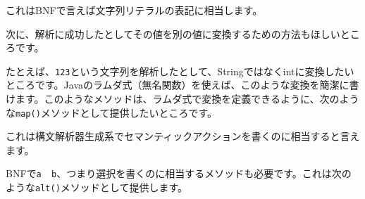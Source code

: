 これはBNFで言えば文字列リテラルの表記に相当します。

次に、解析に成功したとしてその値を別の値に変換するための方法もほしいところです。

たとえば、\texttt{123}という文字列を解析したとして、Stringではなくintに変換したいところです。Javaのラムダ式（無名関数）を使えば、このような変換を簡潔に書けます。このようなメソッドは、ラムダ式で変換を定義できるように、次のような\texttt{map()}メソッドとして提供したいところです。

\begin{Shaded}
\begin{Highlighting}[]
\NormalTok{ (} \NormalTok{\textless{}}\NormalTok{\textgreater{}(}\NormalTok{, }\NormalTok{(}
    \NormalTok{(}\NormalTok{(}\NormalTok{(}\NormalTok{)}
\NormalTok{);}
\end{Highlighting}
\end{Shaded}

これは構文解析器生成系でセマンティックアクションを書くのに相当すると言えます。

BNFで\texttt{a\ \textbar{}\ b}、つまり選択を書くのに相当するメソッドも必要です。これは次のような\texttt{alt()}メソッドとして提供します。

\begin{Shaded}
\begin{Highlighting}[]
\NormalTok{ (} \NormalTok{\textless{}}\NormalTok{\textgreater{}(}\NormalTok{, }\NormalTok{(}
    \NormalTok{(}\NormalTok{(}\NormalTok{), }\NormalTok{(}\NormalTok{(}\NormalTok{)}
\NormalTok{);}
\end{Highlighting}
\end{Shaded}


